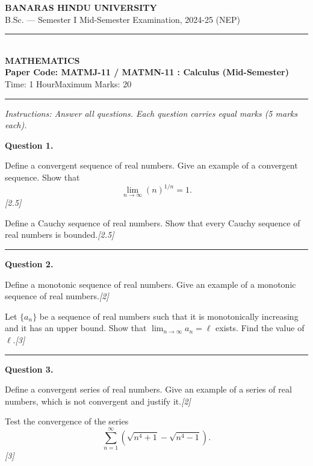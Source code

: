 \documentclass[11pt,a4paper]{article}
\newcommand{\pts}[1]{\hfill\textit{[#1]}}
\begin{document}
\begin{center}
  {\large\bfseries BANARAS HINDU UNIVERSITY}\\[2pt]
  {\normalsize B.Sc. --- Semester I Mid-Semester Examination, 2024-25 (NEP)}\\[6pt]
  \rule{0.8\linewidth}{0.5pt}\\[6pt]
  {\large\bfseries MATHEMATICS}\\[4pt]
  {\large\bfseries Paper Code: MATMJ-11 / MATMN-11 : Calculus (Mid-Semester)}\\[4pt]
  {\normalsize Time: 1 Hour\hfill Maximum Marks: 20}
\end{center}

\rule{\linewidth}{0.4pt}

\smallskip
\noindent\textit{Instructions: Answer all questions. Each question carries equal marks (5 marks each).}

\bigskip

\noindent\textbf{Question 1.}
\begin{parts}
  \item Define a convergent sequence of real numbers. Give an example of a convergent sequence. Show that
  \[
    \lim_{n \to \infty} (n)^{1/n} = 1.
  \]\pts{2.5}
  \item Define a Cauchy sequence of real numbers. Show that every Cauchy sequence of real numbers is bounded.\pts{2.5}
\end{parts}

\medskip\rule{\linewidth}{0.2pt}\medskip

\noindent\textbf{Question 2.}
\begin{parts}
  \item Define a monotonic sequence of real numbers. Give an example of a monotonic sequence of real numbers.\pts{2}
  \item Let $\{a_n\}$ be a sequence of real numbers such that it is monotonically increasing and it has an upper bound. Show that $\lim_{n \to \infty} a_n = \ell$ exists. Find the value of $\ell$.\pts{3}
\end{parts}

\medskip\rule{\linewidth}{0.2pt}\medskip

\noindent\textbf{Question 3.}
\begin{parts}
  \item Define a convergent series of real numbers. Give an example of a series of real numbers, which is not convergent and justify it.\pts{2}
  \item Test the convergence of the series
  \[
    \sum_{n=1}^{\infty} \left( \sqrt{n^4 + 1} - \sqrt{n^4 - 1} \right).
  \]\pts{3}
\end{parts}
\end{document}
